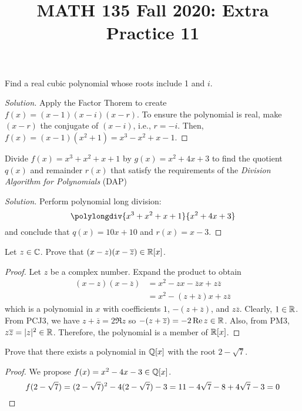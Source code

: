 \documentclass{agony}
\title{MATH 135 Fall 2020: Extra Practice 11}
\begin{document}
\thispagestyle{firstpage}

\textbf{\thetitle}


\question Find a real cubic polynomial whose roots include 1 and $i$.
\begin{proof}[Solution]
  Apply the Factor Thorem to create $f(x) = (x-1)(x-i)(x-r)$.
  To ensure the polynomial is real, make $(x-r)$ the conjugate of $(x-i)$, i.e., $r=-i$.
  Then, $f(x) = (x-1)(x^2+1) = x^3 - x^2 + x - 1$.
\end{proof}


\question Divide $f(x)=x^3+x^2+x+1$ by $g(x)=x^2+4x+3$ to find the quotient $q(x)$ and remainder $r(x)$
that satisfy the requirements of the \emph{Division Algorithm for Polynomials} (DAP)
\begin{proof}[Solution]
  Perform polynomial long division:
  \[ \polylongdiv{x^3+x^2+x+1}{x^2+4x+3} \]
  and conclude that $q(x) = 10x + 10$ and $r(x) = x - 3$.
\end{proof}



\question Let $z\in\mathbb{C}$. Prove that $(x-z)(x-\overline{z}) \in \mathbb{R}[x]$.
\begin{proof}
  Let $z$ be a complex number.
  Expand the product to obtain
  \begin{align*}
    (x-z)(x-\overline{z}) & = x^2 - zx - \overline{z}x + z\overline{z}  \\
                          & = x^2 - (z + \overline{z})x + z\overline{z}
  \end{align*}
  which is a polynomial in $x$ with coefficients $1$, $-(z+\overline{z})$, and $z\overline{z}$.
  Clearly, $1 \in \mathbb{R}$.
  From PCJ3, we have $z+\overline{z} = 2\Re z$ so $-(z+\overline{z}) = -2 \Re z \in \mathbb{R}$.
  Also, from PM3, $z\overline{z}=|z|^2 \in \mathbb{R}$.
  Therefore, the polynomial is a member of $\mathbb{R}[x]$.
\end{proof}


\question Prove that there exists a polynomial in $\mathbb{Q}[x]$ with the root $2-\sqrt 7$.
\begin{proof}
  We propose $f(x) = x^2 - 4x - 3 \in \mathbb{Q}[x]$.
  \[ f(2-\sqrt{7}) = (2-\sqrt7)^2 - 4(2-\sqrt7) - 3 = 11 - 4\sqrt7 - 8 + 4\sqrt7 - 3 = 0 \qedhere \]
\end{proof}
\end{document}
